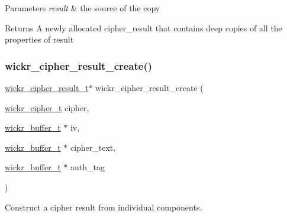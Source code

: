 \begin{DoxyParams}{Parameters}
{\em result} & the source of the copy \\
\hline
\end{DoxyParams}
\begin{DoxyReturn}{Returns}
A newly allocated cipher\+\_\+result that contains deep copies of all the properties of \textquotesingle{}result\textquotesingle{} 
\end{DoxyReturn}
\mbox{\label{group__wickr__cipher_ga234b60967d0b3ef0088ca3ac30755dde}} 
\subsubsection{\texorpdfstring{wickr\+\_\+cipher\+\_\+result\+\_\+create()}{wickr\_cipher\_result\_create()}}
{\footnotesize\ttfamily \hyperlink{structwickr__cipher__result}{wickr\+\_\+cipher\+\_\+result\+\_\+t}$\ast$ wickr\+\_\+cipher\+\_\+result\+\_\+create (\begin{DoxyParamCaption}\item[{\hyperlink{structwickr__cipher}{wickr\+\_\+cipher\+\_\+t}}]{cipher,  }\item[{\hyperlink{structwickr__buffer}{wickr\+\_\+buffer\+\_\+t} $\ast$}]{iv,  }\item[{\hyperlink{structwickr__buffer}{wickr\+\_\+buffer\+\_\+t} $\ast$}]{cipher\+\_\+text,  }\item[{\hyperlink{structwickr__buffer}{wickr\+\_\+buffer\+\_\+t} $\ast$}]{auth\+\_\+tag }\end{DoxyParamCaption})}

Construct a cipher result from individual components.


